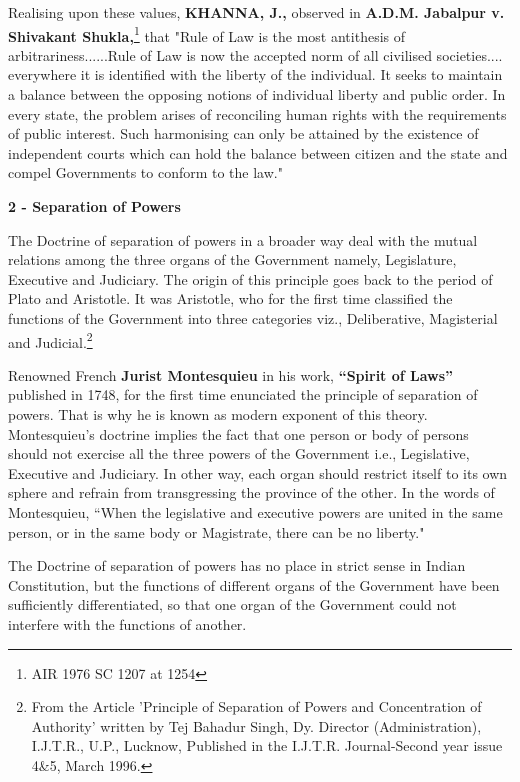 \begin{multicols}{2}
\vspace{-.3cm}

\noi
Realising upon these values, \textbf{KHANNA, J.,} observed in \textbf{A.D.M. Jabalpur v. Shivakant Shukla,}\footnote{AIR 1976 SC 1207 at 1254} that "Rule of Law is the most antithesis of arbitrariness......Rule of Law is now the accepted norm of all civilised societies.... everywhere it is identified with the liberty of the
individual. It seeks to maintain a balance between the opposing notions of individual liberty and
public order. In every state, the problem arises of reconciling human rights with the requirements
of public interest. Such harmonising can only be attained by the existence of independent courts
which can hold the balance between citizen and the state and compel Governments to conform to
the law."

\noi
{\large \bfseries 2 - Separation of Powers}

\noi
The Doctrine of separation of powers in a broader way deal with the mutual relations among the
three organs of the Government namely, Legislature, Executive and Judiciary. The origin of this
principle goes back to the period of Plato and Aristotle. It was Aristotle, who for the first time classified the functions of the Government into three categories viz., Deliberative, Magisterial
and Judicial.\footnote{From the Article 'Principle of Separation of Powers and Concentration of Authority' written by Tej Bahadur Singh, Dy. Director (Administration), I.J.T.R., U.P., Lucknow, Published in the I.J.T.R. Journal-Second year issue 4\&5, March 1996.}

\noi
Renowned French \textbf{Jurist Montesquieu} in his work, \textbf{“Spirit of Laws”} published in 1748, for the
first time enunciated the principle of separation of powers. That is why he is known as modern
exponent of this theory. Montesquieu's doctrine implies the fact that one person or body of persons
should not exercise all the three powers of the Government i.e., Legislative, Executive and
Judiciary. In other way, each organ should restrict itself to its own sphere and refrain from
transgressing the province of the other. In the words of Montesquieu, “When the legislative and
executive powers are united in the same person, or in the same body or Magistrate, there can be
no liberty."

\noi
The Doctrine of separation of powers has no place in strict sense in Indian Constitution, but the
functions of different organs of the Government have been sufficiently differentiated, so that one
organ of the Government could not interfere with the functions of another.


\end{multicols}
